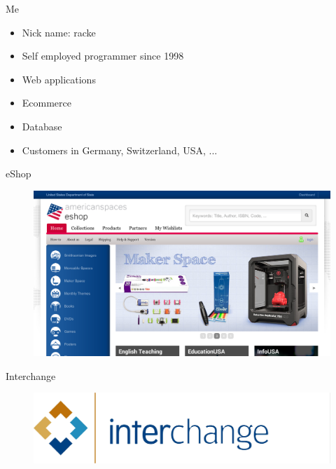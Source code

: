 

\begin{frame}{Me}
\begin{itemize}
\item Nick name: racke
\item Self employed programmer since 1998
\item Web applications
\item Ecommerce
\item Database
\item Customers in Germany, Switzerland, USA, ...
\end{itemize}
\end{frame}


\begin{frame}{eShop}
\begin{figure}[!ht]
\centering
\includegraphics[width=1\linewidth]{img/eshop.png}
\end{figure}
\end{frame}

\begin{frame}{Interchange}
\begin{figure}[!ht]
\centering
\includegraphics[width=1\linewidth]{img/interchange.jpg}
\end{figure}
\end{frame}

